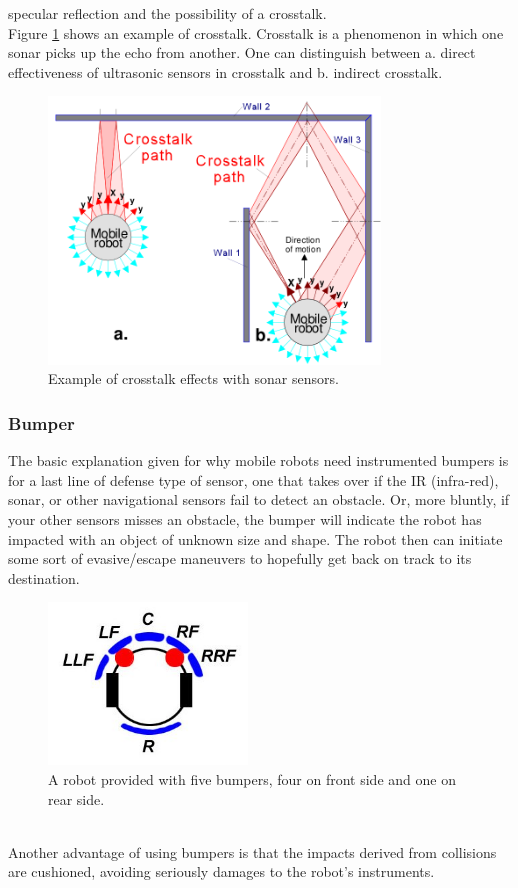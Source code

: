 specular reflection and the possibility of a crosstalk.
\\
Figure \ref{fig:sonar_crosstalk} shows an example of crosstalk.
Crosstalk is a phenomenon in which one sonar picks up the echo
from another. One can distinguish between a. direct effectiveness
of ultrasonic sensors in crosstalk and b. indirect crosstalk.
\begin{figure} [h]
  \begin{center}
    \includegraphics[width=250pt]{img/sonar_crosstalk.png}
    \caption{Example of crosstalk effects with sonar sensors.}
    \label{fig:sonar_crosstalk}
  \end{center}
\end{figure}

\subsubsection{Bumper}
\label{sec:mobile:bumper}

The basic explanation given for why mobile robots need instrumented
bumpers is for a last line of defense type of sensor, one that takes
over if the IR (infra-red), sonar, or other navigational sensors fail
to detect an obstacle. Or, more bluntly, if your other sensors misses
an obstacle, the bumper will indicate the robot has impacted with an
object of unknown size and shape. The robot then can initiate some
sort of evasive/escape maneuvers to
hopefully get back on track to its destination.
\begin{figure} [h]
  \begin{center}
    \includegraphics[width=200px]{img/bumpers.jpg}
    \caption{A robot provided with five bumpers, four on front
      side and one on rear side.}
    \label{fig:bumpers}
  \end{center}
\end{figure}
\\
Another advantage of using bumpers is that the impacts derived from
collisions are cushioned, avoiding seriously damages to the robot's
instruments.


